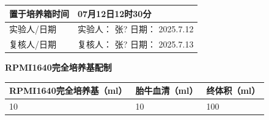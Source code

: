 \documentclass[UTF8,10pt,a4paper,fontset=fandol]{ctexart}
\newcommand{\fieldvalue}[1]{#1}
\newcommand{\handwritten}[1]{#1}
\begin{document}
\begin{center}
\begin{center}
\noindent
\begin{tabularx}{\textwidth}{|p{}|X|}
\hline
置于培养箱时间 &
\fieldvalue{\handwritten{07月12日12时30分}}\\
\hline
实验人/日期 &
实验人：
\fieldvalue{\handwritten{张?}} \quad 日期：
\fieldvalue{\handwritten{2025.7.12}}\\
\hline
复核人/日期 &
复核人：
\fieldvalue{\handwritten{张?}} \quad 日期：
\fieldvalue{\handwritten{2025.7.13}}\\
\hline
\end{tabularx}

\begin{center}
\textbf{RPMI1640完全培养基配制}
\end{center}

\noindent
\begin{tabularx}{\textwidth}{|X|X|X|}
\hline
RPMI1640完全培养基（ml） & 胎牛血清（ml） & 终体积（ml）\\
\hline
\fieldvalue{\handwritten{10}} &
\fieldvalue{\handwritten{10}} &
\fieldvalue{\handwritten{100}}\\
\hline
\end{tabularx}


\end{center}
\end{center}
\end{document}
